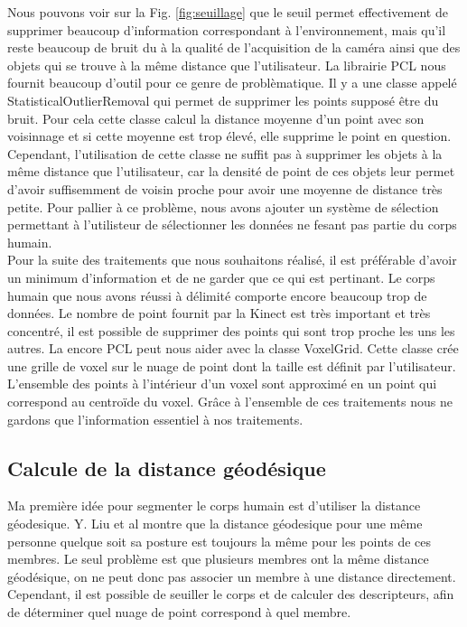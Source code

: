 Nous pouvons voir sur la Fig. \ref{fig:seuillage} que le seuil permet effectivement de supprimer beaucoup d'information
correspondant à l'environnement, mais qu'il reste beaucoup de bruit du à la qualité de l'acquisition de la caméra ainsi que 
des objets qui se trouve à la même distance que l'utilisateur. La librairie
PCL\cite{PCL} nous fournit beaucoup d'outil pour ce genre de problèmatique. Il y a une classe appelé StatisticalOutlierRemoval
qui permet de supprimer les points supposé être du bruit. Pour cela cette classe calcul la distance moyenne d'un point avec son
voisinnage et si cette moyenne est trop élevé, elle supprime le point en question. Cependant, l'utilisation de cette classe ne
suffit pas à supprimer les objets à la même distance que l'utilisateur, car la densité de point de ces objets leur permet d'avoir
suffisemment de voisin proche pour avoir une moyenne de distance très petite. Pour pallier à ce problème, nous avons ajouter un
système de sélection permettant à l'utilisteur de sélectionner les données ne fesant pas partie du corps humain.\\

Pour la suite des traitements que nous souhaitons réalisé, il est préférable d'avoir un minimum d'information et de ne garder
que ce qui est pertinant. Le corps humain que nous avons réussi à délimité comporte encore beaucoup trop de données. Le nombre
de point fournit par la Kinect est très important et très concentré, il est possible de supprimer des points qui sont trop 
proche les uns les autres. La encore PCL\cite{PCL} peut nous aider avec la classe VoxelGrid. Cette classe crée une grille de
voxel sur le nuage de point dont la taille est définit par l'utilisateur. L'ensemble des points à l'intérieur d'un voxel sont 
approximé en un point qui correspond au centroïde du voxel. Grâce à l'ensemble de ces traitements nous ne gardons que l'information 
essentiel à nos traitements.

\subsection{Calcule de la distance géodésique}
Ma première idée pour segmenter le corps humain est d'utiliser la distance géodesique. Y. Liu et al\cite{GIF} montre que la distance
géodesique pour une même personne quelque soit sa posture est toujours la même pour les points de ces membres. Le seul problème 
est que plusieurs membres ont la même distance géodésique, on ne peut donc pas associer un membre à une distance directement.
Cependant, il est possible de seuiller le corps et de calculer des descripteurs, afin de déterminer quel nuage de point
correspond à quel membre.\\

